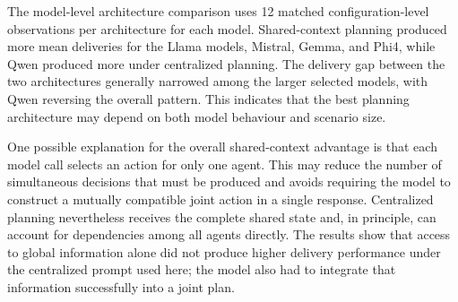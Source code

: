 \begin{table}[H]
\centering
\small
{}
\caption{Planning architecture comparison by scenario. Each architecture--scenario cell summarises 16 configuration-level observations matched by objective, prompt configuration, model, and scenario.}
\label{tab:central_shared_scenario}
\end{table}

The model-level architecture comparison uses 12 matched configuration-level observations per architecture for each model. Shared-context planning produced more mean deliveries for the Llama models, Mistral, Gemma, and Phi4, while Qwen produced more under centralized planning. The delivery gap between the two architectures generally narrowed among the larger selected models, with Qwen reversing the overall pattern. This indicates that the best planning architecture may depend on both model behaviour and scenario size.

One possible explanation for the overall shared-context advantage is that each model call selects an action for only one agent. This may reduce the number of simultaneous decisions that must be produced and avoids requiring the model to construct a mutually compatible joint action in a single response. Centralized planning nevertheless receives the complete shared state and, in principle, can account for dependencies among all agents directly. The results show that access to global information alone did not produce higher delivery performance under the centralized prompt used here; the model also had to integrate that information successfully into a joint plan.

